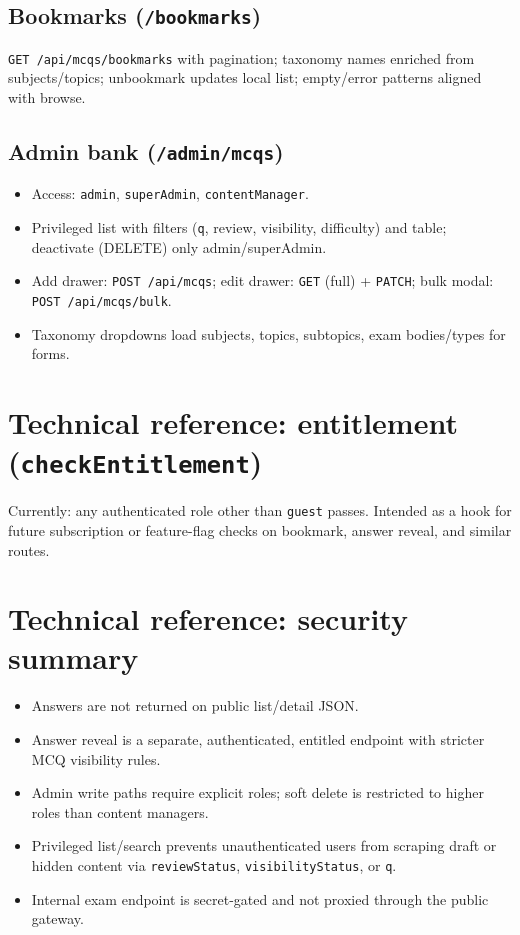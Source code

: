 \documentclass[11pt,a4paper]{article}
\begin{document}
\subsection{Bookmarks (\texttt{/bookmarks})}

\texttt{GET /api/mcqs/bookmarks} with pagination; taxonomy names enriched from subjects/topics; unbookmark updates local list; empty/error patterns aligned with browse.

\subsection{Admin bank (\texttt{/admin/mcqs})}

\begin{itemize}[leftmargin=*]
  \item Access: \texttt{admin}, \texttt{superAdmin}, \texttt{contentManager}.
  \item Privileged list with filters (\texttt{q}, review, visibility, difficulty) and table; deactivate (DELETE) only admin/superAdmin.
  \item Add drawer: \texttt{POST /api/mcqs}; edit drawer: \texttt{GET} (full) + \texttt{PATCH}; bulk modal: \texttt{POST /api/mcqs/bulk}.
  \item Taxonomy dropdowns load subjects, topics, subtopics, exam bodies/types for forms.
\end{itemize}

\section{Technical reference: entitlement (\texttt{checkEntitlement})}

Currently: any authenticated role other than \texttt{guest} passes. Intended as a hook for future subscription or feature-flag checks on bookmark, answer reveal, and similar routes.

\section{Technical reference: security summary}

\begin{itemize}[leftmargin=*]
  \item Answers are not returned on public list/detail JSON.
  \item Answer reveal is a separate, authenticated, entitled endpoint with stricter MCQ visibility rules.
  \item Admin write paths require explicit roles; soft delete is restricted to higher roles than content managers.
  \item Privileged list/search prevents unauthenticated users from scraping draft or hidden content via \texttt{reviewStatus}, \texttt{visibilityStatus}, or \texttt{q}.
  \item Internal exam endpoint is secret-gated and not proxied through the public gateway.
\end{itemize}
\end{document}
